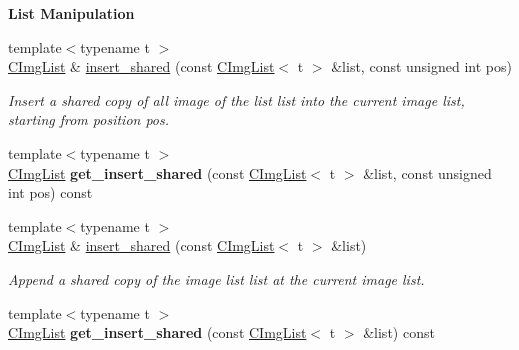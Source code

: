 \begin{Indent}{\bf List Manipulation}
\begin{DoxyCompactItemize}
\item 
\hypertarget{structcimg__library_1_1_c_img_list_a21a21fb33a6bed35fcf15ea8c5b63700}{
{\footnotesize template$<$typename t $>$ }\\\hyperlink{structcimg__library_1_1_c_img_list}{CImgList} \& \hyperlink{structcimg__library_1_1_c_img_list_a21a21fb33a6bed35fcf15ea8c5b63700}{insert\_\-shared} (const \hyperlink{structcimg__library_1_1_c_img_list}{CImgList}$<$ t $>$ \&list, const unsigned int pos)}
\label{structcimg__library_1_1_c_img_list_a21a21fb33a6bed35fcf15ea8c5b63700}

\begin{DoxyCompactList}\small\item\em Insert a shared copy of all image of the list {\ttfamily list} into the current image list, starting from position {\ttfamily pos}. \item\end{DoxyCompactList}\item 
\hypertarget{structcimg__library_1_1_c_img_list_a0761dc5267d9687aefe5185d5cea27f0}{
{\footnotesize template$<$typename t $>$ }\\\hyperlink{structcimg__library_1_1_c_img_list}{CImgList} {\bfseries get\_\-insert\_\-shared} (const \hyperlink{structcimg__library_1_1_c_img_list}{CImgList}$<$ t $>$ \&list, const unsigned int pos) const }
\label{structcimg__library_1_1_c_img_list_a0761dc5267d9687aefe5185d5cea27f0}

\item 
\hypertarget{structcimg__library_1_1_c_img_list_a1cc1d543c94df97a08312d66c9d83461}{
{\footnotesize template$<$typename t $>$ }\\\hyperlink{structcimg__library_1_1_c_img_list}{CImgList} \& \hyperlink{structcimg__library_1_1_c_img_list_a1cc1d543c94df97a08312d66c9d83461}{insert\_\-shared} (const \hyperlink{structcimg__library_1_1_c_img_list}{CImgList}$<$ t $>$ \&list)}
\label{structcimg__library_1_1_c_img_list_a1cc1d543c94df97a08312d66c9d83461}

\begin{DoxyCompactList}\small\item\em Append a shared copy of the image list {\ttfamily list} at the current image list. \item\end{DoxyCompactList}\item 
\hypertarget{structcimg__library_1_1_c_img_list_a9c2508095c041bb9c02b38fb19d7c30f}{
{\footnotesize template$<$typename t $>$ }\\\hyperlink{structcimg__library_1_1_c_img_list}{CImgList} {\bfseries get\_\-insert\_\-shared} (const \hyperlink{structcimg__library_1_1_c_img_list}{CImgList}$<$ t $>$ \&list) const }
\label{structcimg__library_1_1_c_img_list_a9c2508095c041bb9c02b38fb19d7c30f}


\end{DoxyCompactItemize}
\end{Indent}
